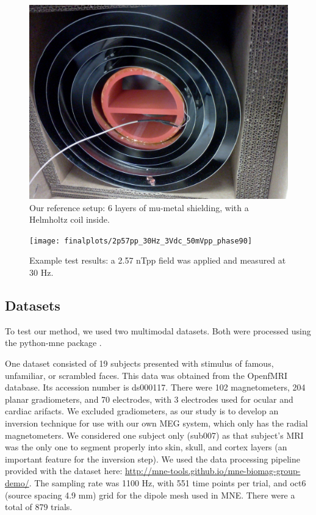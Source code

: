 \documentclass[journal,12pt,onecolumn,draftclsnofoot]{IEEEtran}
\begin{document}
\begin{figure}[h!]
\centering
\includegraphics[width=5in]{finalplots/helmholtz_in_shield}
\caption{Our reference setup: 6 layers of mu-metal shielding, with a Helmholtz coil inside.}
\label{fig:helmholtz_in_shield}
\end{figure}

\begin{figure}[h!]
\centering
\texttt{[image: finalplots/2p57pp\_30Hz\_3Vdc\_50mVpp\_phase90]}
\caption{Example test results: a 2.57 nTpp field was applied and measured at 30 Hz.}
\label{fig:test}
\end{figure}


\subsection{Datasets}

To test our method, we used two multimodal datasets. Both were processed using the python-mne package \cite{gramfort2014mne}.

One dataset \cite{wakeman2015multi} consisted of 19 subjects presented with stimulus of famous, unfamiliar, or scrambled faces. This data was obtained from the OpenfMRI database. Its accession number is ds000117. There were 102 magnetometers, 204 planar gradiometers, and 70 electrodes, with 3 electrodes used for ocular and cardiac arifacts. We excluded gradiometers, as our study is to develop an inversion technique for use with our own MEG system, which only has the radial magnetometers. We considered one subject only (sub007) as that subject's MRI was the only one to segment properly into skin, skull, and cortex layers (an important feature for the inversion step). We used the data processing pipeline provided with the dataset here: \url{http://mne-tools.github.io/mne-biomag-group-demo/}. The sampling rate was 1100 Hz, with 551 time points per trial, and oct6 (source spacing 4.9 mm) grid for the dipole mesh used in MNE. There were a total of 879 trials.
\end{document}
